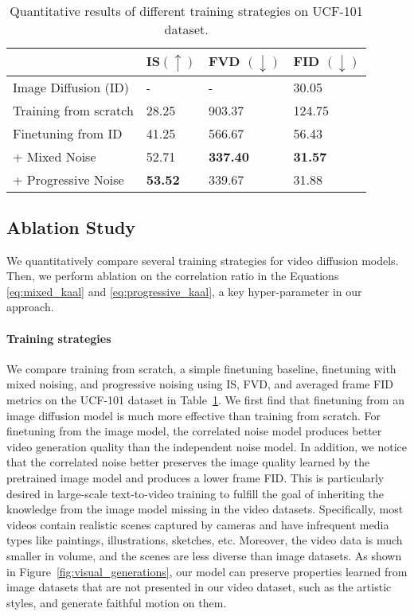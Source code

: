 \documentclass[10pt,twocolumn,letterpaper]{article}
\newcommand{\new}[1]{#1}
\newcommand{\tabcspace}{\vspace{-2mm}}
\newcommand{\tabspace}{\vspace{-4mm}}
\begin{document}
\begin{table}[t]
\centering
\caption{Quantitative results of different training strategies \new{on UCF-101 dataset.}}
\tabcspace
\label{tab:strategies}
\begin{tabular}{l|lll}
\toprule
                 & IS$(\uparrow)$ & FVD $(\downarrow)$ &  FID $(\downarrow)$ \\
\midrule
Image Diffusion (ID)  & -     & -      & 30.05  \\ \hline
Training from scratch  & 28.25 & 903.37 & 124.75 \\
Finetuning from ID      & 41.25 & 566.67 & 56.43  \\
\rowcolor[HTML]{DFDFDF} 
+ Mixed Noise        & 52.71 & \textbf{337.40} & \textbf{31.57}  \\
\rowcolor[HTML]{DFDFDF} 
+ Progressive Noise  & \textbf{53.52} & 339.67 & 31.88  \\
\bottomrule
\end{tabular}
\tabspace
\end{table} \subsection{Ablation Study}
We quantitatively compare several training strategies for video diffusion models. Then, we perform ablation on the correlation ratio in the Equations \ref{eq:mixed_kaal} and \ref{eq:progressive_kaal}, a key hyper-parameter in our approach.


\paragraph{Training strategies} We compare training from scratch, a simple finetuning baseline, finetuning with mixed noising, and progressive noising using IS, FVD, and averaged frame FID metrics \new{on the UCF-101 dataset} in Table~\ref{tab:strategies}. We first find that finetuning from an image diffusion model is much more effective than training from scratch. For finetuning from the image model, the correlated noise model produces better video generation quality than the independent noise model. In addition, we notice that the correlated noise better preserves the image quality learned by the pretrained image model and produces a lower frame FID. This is particularly desired in large-scale text-to-video training to fulfill the goal of inheriting the knowledge from the image model missing in the video datasets. \new{Specifically, most videos contain realistic scenes captured by cameras and have infrequent media types like paintings, illustrations, sketches, etc. 
Moreover, the video data is much smaller in volume, and the scenes are less diverse than image datasets.} As shown in Figure~\ref{fig:visual_generations}, our model can preserve properties learned from image datasets that are not presented in our video dataset, such as the artistic styles, and generate faithful motion on them.
\end{document}
